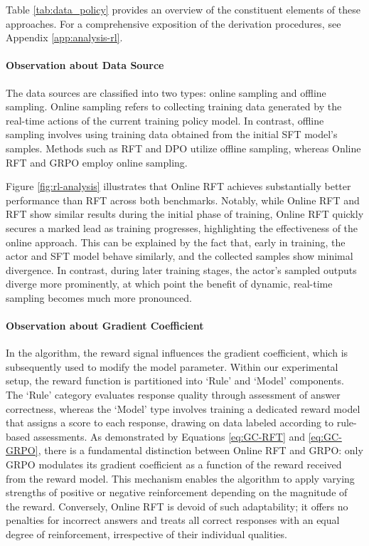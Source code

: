 \begin{itemize}[topsep=0pt]
\begin{itemize}[topsep=0pt]
Table \ref{tab:data_policy} provides an overview of the constituent elements of these approaches. For a comprehensive exposition of the derivation procedures, see Appendix \ref{app:analysis-rl}.

\paragraph{Observation about Data Source} The data sources are classified into two types: online sampling and offline sampling. Online sampling refers to collecting training data generated by the real-time actions of the current training policy model. In contrast, offline sampling involves using training data obtained from the initial SFT model's samples. Methods such as RFT and DPO utilize offline sampling, whereas Online RFT and GRPO employ online sampling.

Figure \ref{fig:rl-analysis} illustrates that Online RFT achieves substantially better performance than RFT across both benchmarks. Notably, while Online RFT and RFT show similar results during the initial phase of training, Online RFT quickly secures a marked lead as training progresses, highlighting the effectiveness of the online approach. This can be explained by the fact that, early in training, the actor and SFT model behave similarly, and the collected samples show minimal divergence. In contrast, during later training stages, the actor’s sampled outputs diverge more prominently, at which point the benefit of dynamic, real-time sampling becomes much more pronounced.

\paragraph{Observation about Gradient Coefficient} In the algorithm, the reward signal influences the gradient coefficient, which is subsequently used to modify the model parameter. Within our experimental setup, the reward function is partitioned into `Rule' and `Model' components. The `Rule' category evaluates response quality through assessment of answer correctness, whereas the `Model' type involves training a dedicated reward model that assigns a score to each response, drawing on data labeled according to rule-based assessments. As demonstrated by Equations \ref{eq:GC-RFT} and \ref{eq:GC-GRPO}, there is a fundamental distinction between Online RFT and GRPO: only GRPO modulates its gradient coefficient as a function of the reward received from the reward model. This mechanism enables the algorithm to apply varying strengths of positive or negative reinforcement depending on the magnitude of the reward. Conversely, Online RFT is devoid of such adaptability; it offers no penalties for incorrect answers and treats all correct responses with an equal degree of reinforcement, irrespective of their individual qualities.


\end{itemize}
\end{itemize}
